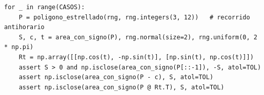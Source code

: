 %
\begin{lstlisting}
for _ in range(CASOS):
    P = poligono_estrellado(rng, rng.integers(3, 12))   # recorrido antihorario
    S, c, t = area_con_signo(P), rng.normal(size=2), rng.uniform(0, 2 * np.pi)
    Rt = np.array([[np.cos(t), -np.sin(t)], [np.sin(t), np.cos(t)]])
    assert S > 0 and np.isclose(area_con_signo(P[::-1]), -S, atol=TOL)
    assert np.isclose(area_con_signo(P - c), S, atol=TOL)
    assert np.isclose(area_con_signo(P @ Rt.T), S, atol=TOL)
\end{lstlisting}
\comprobacionPie

